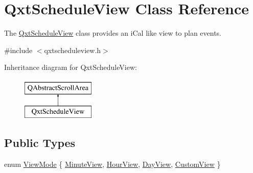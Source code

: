 \hypertarget{class_qxt_schedule_view}{\section{Qxt\-Schedule\-View Class Reference}
\label{class_qxt_schedule_view}
}


The \hyperlink{class_qxt_schedule_view}{Qxt\-Schedule\-View} class provides an i\-Cal like view to plan events.  




{\ttfamily \#include $<$qxtscheduleview.\-h$>$}

Inheritance diagram for Qxt\-Schedule\-View\-:\begin{figure}[H]
\begin{center}
\leavevmode
\includegraphics[height=2.000000cm]{class_qxt_schedule_view}
\end{center}
\end{figure}
\subsection*{Public Types}
\begin{DoxyCompactItemize}
\item 
enum \hyperlink{class_qxt_schedule_view_ac4a79a5a6631b96d95a4f83e9f873a60}{View\-Mode} \{ \hyperlink{class_qxt_schedule_view_ac4a79a5a6631b96d95a4f83e9f873a60aff824c953d964c85fc4252852ac2f322}{Minute\-View}, 
\hyperlink{class_qxt_schedule_view_ac4a79a5a6631b96d95a4f83e9f873a60ab902b6abcf60f654bf6e65d12c9014c1}{Hour\-View}, 
\hyperlink{class_qxt_schedule_view_ac4a79a5a6631b96d95a4f83e9f873a60a4f9747116254d5cf31c31c199ceafc4f}{Day\-View}, 
\hyperlink{class_qxt_schedule_view_ac4a79a5a6631b96d95a4f83e9f873a60a4291bc6f82cf2d739c54d9c1902fcefc}{Custom\-View}
 \}
\end{DoxyCompactItemize}
